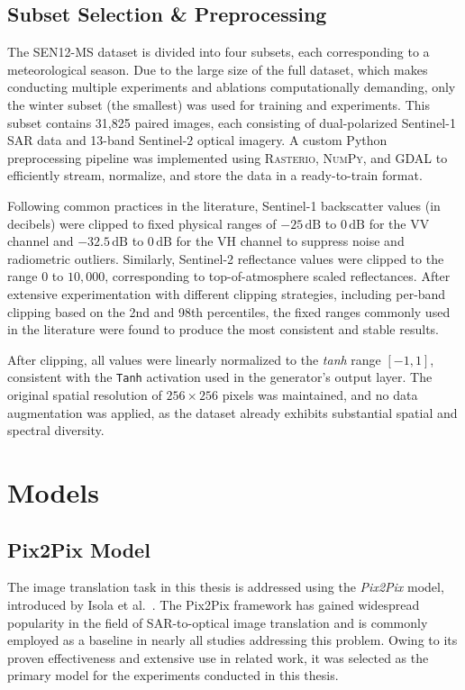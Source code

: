 \subsection{Subset Selection \& Preprocessing}
\label{subsec:preprocessing}
The SEN12-MS dataset is divided into four subsets, each corresponding to a meteorological season. Due to the large size of the full dataset, which makes conducting multiple experiments and ablations computationally demanding, only the winter subset (the smallest) was used for training and experiments. This subset contains 31,825 paired images, each consisting of dual-polarized Sentinel-1 SAR data and 13-band Sentinel-2 optical imagery. A custom Python preprocessing pipeline was implemented using \textsc{Rasterio}, \textsc{NumPy}, and \textsc{GDAL} to efficiently stream, normalize, and store the data in a ready-to-train format.  

Following common practices in the literature, Sentinel-1 backscatter values (in decibels) were clipped to fixed physical ranges of \(-25\,\text{dB}\) to \(0\,\text{dB}\) for the VV channel and \(-32.5\,\text{dB}\) to \(0\,\text{dB}\) for the VH channel to suppress noise and radiometric outliers. Similarly, Sentinel-2 reflectance values were clipped to the range \(0\) to \(10{,}000\), corresponding to top-of-atmosphere scaled reflectances. After extensive experimentation with different clipping strategies, including per-band clipping based on the 2nd and 98th percentiles, the fixed ranges commonly used in the literature were found to produce the most consistent and stable results. 

After clipping, all values were linearly normalized to the \textit{tanh} range \([-1, 1]\), consistent with the \texttt{Tanh} activation used in the generator’s output layer. The original spatial resolution of \(256 \times 256\) pixels was maintained, and no data augmentation was applied, as the dataset already exhibits substantial spatial and spectral diversity.

\section{Models}
\subsection{Pix2Pix Model}
The image translation task in this thesis is addressed using the \textit{Pix2Pix} model, introduced by Isola et al.~\cite{pix2pix_2018}. The Pix2Pix framework has gained widespread popularity in the field of SAR-to-optical image translation and is commonly employed as a baseline in nearly all studies addressing this problem. Owing to its proven effectiveness and extensive use in related work, it was selected as the primary model for the experiments conducted in this thesis.

